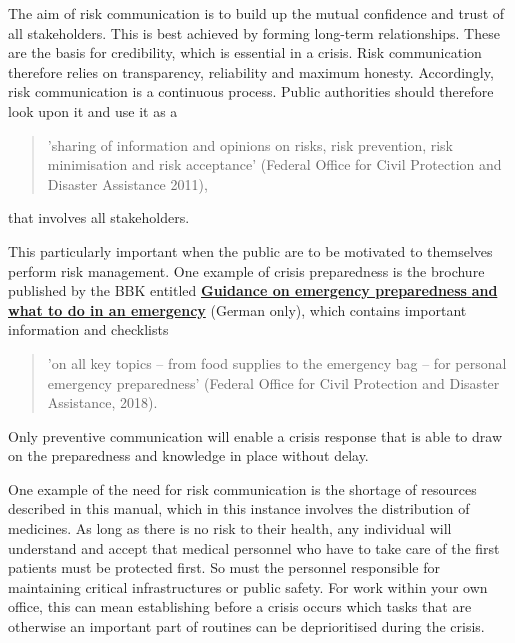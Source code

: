 \documentclass{article}
\begin{document}
The aim of risk communication is to build up the mutual confidence and trust of all stakeholders. This is best achieved by forming long-term relationships. These are the basis for credibility, which is essential in a crisis. Risk communication therefore relies on transparency, reliability and maximum honesty. Accordingly, risk communication is a continuous process. Public authorities should therefore look upon it and use it as a

\begin{quote}



'sharing of information and opinions on risks, risk prevention, risk minimisation and risk acceptance' (Federal Office for Civil Protection and Disaster Assistance 2011),


\end{quote}


that involves all stakeholders.


This particularly important when the public are to be motivated to themselves perform risk management. One example of crisis preparedness is the brochure published by the BBK entitled \textbf{\href{https://www.bbk.bund.de/SharedDocs/Downloads/BBK/DE/Publikationen/Broschueren_Flyer/Buergerinformationen_A4/Ratgeber_Brosch.pdf}{Guidance on emergency preparedness}}\href{https://www.bbk.bund.de/SharedDocs/Downloads/BBK/DE/Publikationen/Broschueren_Flyer/Buergerinformationen_A4/Ratgeber_Brosch.pdf}{ }\textbf{\href{https://www.bbk.bund.de/SharedDocs/Downloads/BBK/DE/Publikationen/Broschueren_Flyer/Buergerinformationen_A4/Ratgeber_Brosch.pdf}{and what to do in an emergency}} (German only), which contains important information and checklists

\begin{quote}



'on all key topics – from food supplies to the emergency bag – for personal emergency preparedness' (Federal Office for Civil Protection and Disaster Assistance, 2018).


\end{quote}


Only preventive communication will enable a crisis response that is able to draw on the preparedness and knowledge in place without delay.


One example of the need for risk communication is the shortage of resources described in this manual, which in this instance involves the distribution of medicines. As long as there is no risk to their health, any individual will understand and accept that medical personnel who have to take care of the first patients must be protected first. So must the personnel responsible for maintaining critical infrastructures or public safety. For work within your own office, this can mean establishing before a crisis occurs which tasks that are otherwise an important part of routines can be deprioritised during the crisis.
\end{document}
